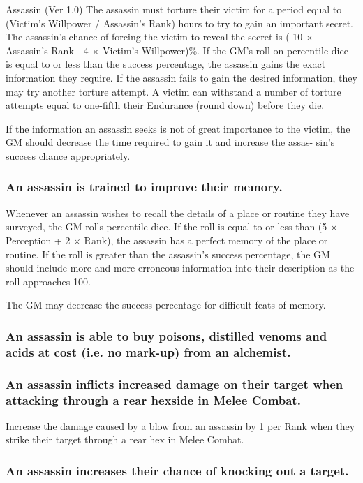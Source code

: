 \begin{Chapter}{Assassin (Ver 1.0)}
The assassin must torture their victim for a period equal to (Victim’s
Willpower / Assassin’s Rank) hours to try to gain an important
secret. The assassin’s chance of forcing the victim to reveal the
secret is ( 10 × Assassin’s Rank - 4 × Victim’s Willpower)\%.  If the
GM’s roll on percentile dice is equal to or less than the success
percentage, the assassin gains the exact information they require. If
the assassin fails to gain the desired information, they may try
another torture attempt. A victim can withstand a number of torture
attempts equal to one-fifth their Endurance (round down) before they
die.

If the information an assassin seeks is not of great importance to the
victim, the GM should decrease the time required to gain it and
increase the assas- sin’s success chance appropriately.

\subsubsection{An assassin is trained to improve their memory.}

Whenever an assassin wishes to recall the details of a place or
routine they have surveyed, the GM rolls percentile dice.  If the roll
is equal to or less than (5 × Perception + 2 × Rank), the assassin has
a perfect memory of the place or routine. If the roll is greater than
the assassin’s success percentage, the GM should include more and more
erroneous information into their description as the roll approaches
100.

The GM may decrease the success percentage for difficult feats of
memory.

\subsubsection{An assassin is able to buy poisons, distilled venoms and acids at cost
(i.e. no mark-up) from an alchemist.}

\subsubsection{An assassin inflicts increased damage on their target when attacking
through a rear hexside in Melee Combat.}

Increase the damage caused by a blow from an assassin by 1 per Rank
when they strike their target through a rear hex in Melee Combat.

\subsubsection{An assassin increases their chance of knocking out a target.}


\end{Chapter}
